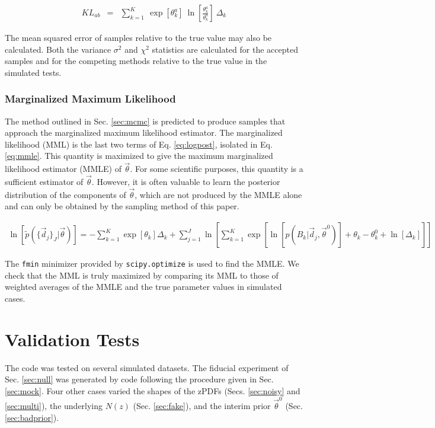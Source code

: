 \documentclass[preprint]{aastex}
\begin{document}
\begin{eqnarray}
\label{eq:kl}
KL_{ab} &=& \sum_{k=1}^{K}\ \exp[\theta_{k}^{a}]\ \ln\left[\frac{\theta_{k}^{a}}{\theta_{k}^{b}}\right]\ \Delta_{k}
\end{eqnarray}

The mean squared error of samples relative to the true value may also be calculated.  Both the variance $\sigma^{2}$ and $\chi^{2}$ statistics are calculated for the accepted samples and for the competing methods relative to the true value in the simulated tests.

\clearpage
\subsubsection{Marginalized Maximum Likelihood}
\label{sec:mmle}

The method outlined in Sec. \ref{sec:mcmc} is predicted to produce samples that approach the marginalized maximum likelihood estimator.  The marginalized likelihood (MML) is the last two terms of Eq. \ref{eq:logpost}, isolated in Eq. \ref{eq:mmle}.  This quantity is maximized to give the maximum marginalized likelihood estimator (MMLE) of $\vec{\theta}$.  For some scientific purposes, this quantity is a sufficient estimator of $\vec{\theta}$.  However, it is often valuable to learn the posterior distribution of the components of $\vec{\theta}$, which are not produced by the MMLE alone and can only be obtained by the sampling method of this paper.

\begin{eqnarray}
\label{eq:mmle}
\ln[\tilde{p}(\{\vec{d}_{j}\}_{J}|\vec{\theta})] = -\sum_{k=1}^{K}\exp[\theta_{k}]\Delta_{k}+\sum_{j=1}^{J}\ln\left[\sum_{k=1}^{K}\exp\left[\ln[p(B_{k}|\vec{d}_{j},\vec{\theta}^{0})]+\theta_{k}-\theta_{k}^{0}+\ln[\Delta_{k}]\right]\right]
\end{eqnarray}

The \texttt{fmin} minimizer provided by \texttt{scipy.optimize} is used to find the MMLE.  We check that the MML is truly maximized by comparing its MML to those of weighted averages of the MMLE and the true parameter values in simulated cases.

\clearpage
\section{Validation Tests}
\label{sec:valid}

The code was tested on several simulated datasets.  The fiducial experiment of Sec. \ref{sec:null} was generated by code following the procedure given in Sec. \ref{sec:mock}.  Four other cases varied the shapes of the zPDFs (Secs. \ref{sec:noisy} and \ref{sec:multi}), the underlying $N(z)$ (Sec. \ref{sec:fake}), and the interim prior $\vec{\theta}^{0}$ (Sec. \ref{sec:badprior}).  
\end{document}
